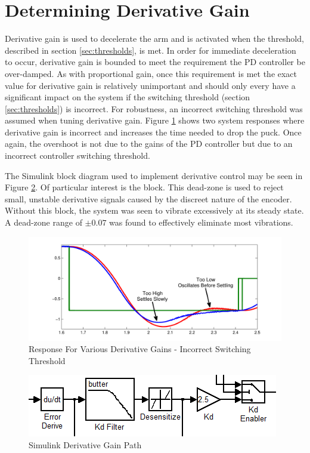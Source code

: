 \section{Determining Derivative Gain}

Derivative gain is used to decelerate the arm and is activated when the threshold, described in section \ref{sec:thresholds}, is met.
In order for immediate deceleration to occur, derivative gain is bounded to meet the requirement the PD controller be over-damped. 
As with proportional gain, once this requirement is met the exact value for derivative gain is relatively unimportant and should only every have a significant impact on the system if the switching threshold (section \ref{sec:thresholds}) is incorrect.
For robustness, an incorrect switching threshold was assumed when tuning derivative gain.
Figure \ref{fig:kd} shows two system responses where derivative gain is incorrect and increases the time needed to drop the puck. 
Once again, the overshoot is not due to the gains of the PD controller but due to an incorrect controller switching threshold.


The Simulink block diagram used to implement derivative control may be seen in Figure \ref{fig:simulinkkd}.
Of particular interest is the  block.
This dead-zone is used to reject small, unstable derivative signals caused by the discreet nature of the encoder. 
Without this block, the system was seen to vibrate excessively at its steady state.
A dead-zone range of $\pm0.07$ was found to effectively eliminate most vibrations.


\begin{figure}[htp]
    \centering
    \includegraphics[width=.8\textwidth]{images/ValuesOfKd.pdf}
    \caption{Response For Various Derivative Gains - Incorrect Switching Threshold}
    \label{fig:kd}
\end{figure}

\begin{figure}[htp]
    \centering
    \includegraphics[scale=0.75]{images/Kd.PNG}
    \caption{Simulink Derivative Gain Path}
    \label{fig:simulinkkd}
\end{figure}
